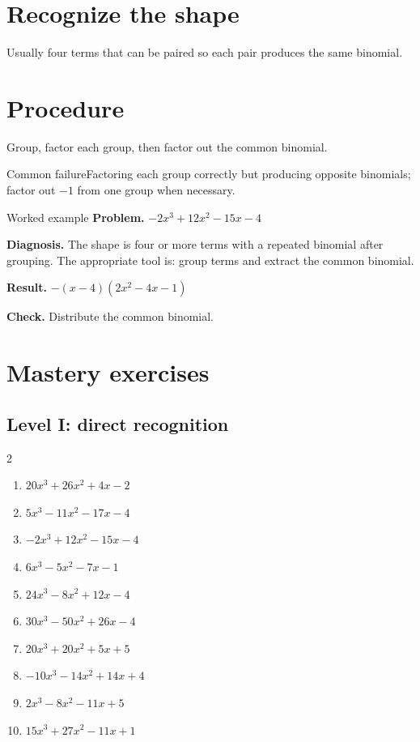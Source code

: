 \documentclass[11pt,oneside]{book}
\begin{document}
\section{Recognize the shape}
Usually four terms that can be paired so each pair produces the same binomial.
\section{Procedure}
Group, factor each group, then factor out the common binomial.

\begin{warningbox}{Common failure}Factoring each group correctly but producing opposite binomials; factor out $-1$ from one group when necessary.\end{warningbox}
\begin{examplebox}{Worked example}
\textbf{Problem.} $ - 2 x^{3} + 12 x^{2} - 15 x - 4 $

\textbf{Diagnosis.} The shape is four or more terms with a repeated binomial after grouping. The appropriate tool is: group terms and extract the common binomial.

\textbf{Result.} $ - \left(x - 4\right) \left(2 x^{2} - 4 x - 1\right) $

\textbf{Check.} Distribute the common binomial.
\end{examplebox}
\section{Mastery exercises}
\subsection*{Level I: direct recognition}
\begin{multicols}{2}
\begin{enumerate}[leftmargin=*,label=\textbf{\arabic*.},itemsep=0.65\baselineskip]
\item $ 20 x^{3} + 26 x^{2} + 4 x - 2 $
\item $ 5 x^{3} - 11 x^{2} - 17 x - 4 $
\item $ - 2 x^{3} + 12 x^{2} - 15 x - 4 $
\item $ 6 x^{3} - 5 x^{2} - 7 x - 1 $
\item $ 24 x^{3} - 8 x^{2} + 12 x - 4 $
\item $ 30 x^{3} - 50 x^{2} + 26 x - 4 $
\item $ 20 x^{3} + 20 x^{2} + 5 x + 5 $
\item $ - 10 x^{3} - 14 x^{2} + 14 x + 4 $
\item $ 2 x^{3} - 8 x^{2} - 11 x + 5 $
\item $ 15 x^{3} + 27 x^{2} - 11 x + 1 $
\end{enumerate}
\end{multicols}
\end{document}
